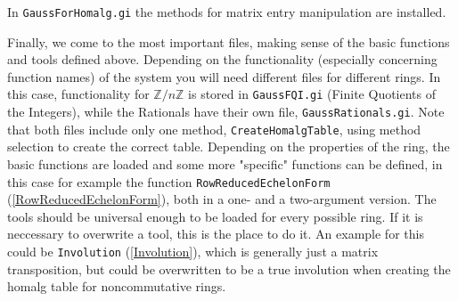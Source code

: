 \documentclass[a4paper,11pt]{report}
\begin{document}
{ In \texttt{GaussForHomalg.gi} the methods for matrix entry manipulation are installed.

 Finally, we come to the most important files, making sense of the basic
functions and tools defined above. Depending on the functionality (especially
concerning function names) of the system you will need different files for
different rings. In this case, functionality for ${\ensuremath{\mathbb Z}} / n {\ensuremath{\mathbb Z}}$ is stored in \texttt{GaussFQI.gi} (Finite Quotients of the Integers), while the Rationals have their own file, \texttt{GaussRationals.gi}. Note that both files include only one method, \texttt{CreateHomalgTable}, using method selection to create the correct table. Depending on the
properties of the ring, the basic functions are loaded and some more
"specific" functions can be defined, in this case for example the function \texttt{RowReducedEchelonForm} (\ref{RowReducedEchelonForm}), both in a one- and a two-argument version. The tools should be universal
enough to be loaded for every possible ring. If it is neccessary to overwrite
a tool, this is the place to do it. An example for this could be \texttt{Involution} (\ref{Involution}), which is generally just a matrix transposition, but could be overwritten to
be a true involution when creating the \textsf{homalg} table for noncommutative rings. }

   
\end{document}
